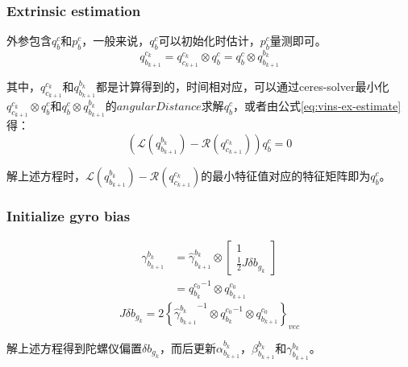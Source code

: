 \subsubsection{Extrinsic estimation}
外参包含$q_b^c$和$p_b^c$，一般来说，$q_b^c$可以初始化时估计，$p_b^c$量测即可。
\begin{equation} \label{eq:vins-ex-estimate}
	q_{b_{k+1}}^{c_k} = q_{c_{k+1}}^{c_k} \otimes q_b^c = q_b^c \otimes q_{b_{k+1}}^{b_k}
\end{equation}
\par 其中，$q_{c_{k+1}}^{c_k}$和$q_{b_{k+1}}^{b_k}$都是计算得到的，时间相对应，可以通过ceres-solver最小化$q_{c_{k+1}}^{c_k}\otimes q_b^c$和$q_b^c \otimes q_{b_{k+1}}^{b_k}$的$angularDistance$求解$q_b^c$，或者由公式\ref{eq:vins-ex-estimate}得：
\begin{equation}
	\left(\mathcal{L}(q_{b_{k+1}}^{b_k}) - \mathcal{R}(q_{c_{k+1}}^{c_k})\right) q_b^c = 0
\end{equation}
\par 解上述方程时，$\mathcal{L}(q_{b_{k+1}}^{b_k}) - \mathcal{R}(q_{c_{k+1}}^{c_k})$的最小特征值对应的特征矩阵即为$q_b^c$。

\subsubsection{Initialize gyro bias}
\begin{equation}
	\begin{split}
		\gamma_{b_{k+1}}^{b_k} &= \hat{\gamma}_{b_{k+1}}^{b_k} \otimes
		\begin{bmatrix}
			1 \\\frac12J\delta{b_{g_k}}
		\end{bmatrix} \\
		&= {q_{b_k}^{c_0}}^{-1} \otimes q_{b_{k+1}}^{c_0}
	\end{split}
\end{equation}
\begin{equation}
	J\delta{b_{g_k}} = 2 \left\lbrace {{}\hat{\gamma}_{b_{k+1}}^{b_k}}^{-1} \otimes {q_{b_k}^{c_0}}^{-1} \otimes q_{b_{k+1}}^{c_0} \right\rbrace_{vec}
\end{equation}
\par 解上述方程得到陀螺仪偏置$\delta{b_{g_k}}$，而后更新$\alpha_{b_{k+1}}^{b_k}$，$\beta_{b_{k+1}}^{b_k}$和$\gamma_{b_{k+1}}^{b_k}$。


